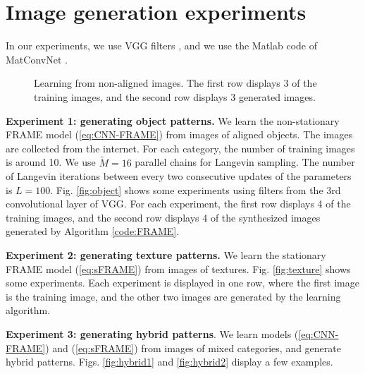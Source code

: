 \documentclass[letterpaper]{article}
\begin{document}
\section{Image generation experiments}

In our experiments, we use VGG filters \citep{simonyan2014very}, and we use the Matlab code of MatConvNet \citep{matconvnn}.


\begin{figure}
	\centering
	\setlength{\fboxrule}{1pt}
	\setlength{\fboxsep}{0cm}	
		\caption{Learning from non-aligned images.  
		The first row displays 3 of the training images, and the second row displays 3 generated images.  }
	\label{fig:nonalign2}
\end{figure}

{\bf Experiment 1: generating object patterns.} We  learn the non-stationary FRAME model (\ref{eq:CNN-FRAME}) from  images of aligned objects. The images are collected from the internet. For each category, the number of training images is around 10. We use $\tilde{M} = 16$  parallel chains for Langevin sampling. The number of Langevin iterations between every two consecutive updates of the parameters is $L = 100$.  Fig. \ref{fig:object} shows some experiments using filters from the 3rd convolutional layer of VGG.  For each experiment, the first row displays 4 of the training images, and the second row displays 4 of the synthesized images generated by Algorithm \ref{code:FRAME}.

{\bf Experiment 2: generating texture patterns.} We  learn the stationary FRAME model (\ref{eq:sFRAME}) from images of textures. Fig. \ref{fig:texture} shows some experiments. Each experiment is displayed in one row, where the first image is the training image, and the other two images are generated by the learning algorithm. 

{\bf Experiment 3: generating hybrid patterns}. We  learn models (\ref{eq:CNN-FRAME}) and  (\ref{eq:sFRAME}) from images of mixed categories, and generate hybrid patterns. Figs. \ref{fig:hybrid1} and \ref{fig:hybrid2} display a few examples. 
\end{document}
